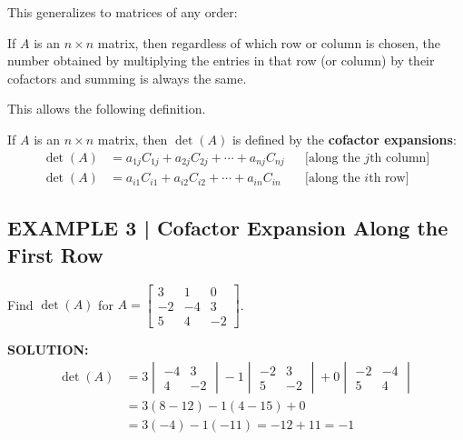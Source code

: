 \documentclass{article}
\theoremstyle{mystyle}
\begin{document}
\vspace{2mm}

This generalizes to matrices of any order:

\begin{tcolorbox}[colback=red!4, colframe=red!60!black,
  title={\textbf{Theorem 2.1.1}}, boxrule=0.5mm, arc=3mm]
If $A$ is an $n\times n$ matrix, then regardless of which row or column is chosen, the number obtained by multiplying the entries in that row (or column) by their cofactors and summing is always the same.
\end{tcolorbox}

This allows the following definition.

\begin{tcolorbox}[colback=teal!4, colframe=teal!65!black,
  title={\textbf{Definition 2}}, boxrule=0.5mm, arc=3mm]
If $A$ is an $n\times n$ matrix, then $\det(A)$ is defined by the \textbf{cofactor expansions}:
\begin{align*}
\det(A)&=a_{1j}C_{1j}+a_{2j}C_{2j}+\cdots+a_{nj}C_{nj} &&\text{[along the }j\text{th column]} \tag{7}\\
\det(A)&=a_{i1}C_{i1}+a_{i2}C_{i2}+\cdots+a_{in}C_{in} &&\text{[along the }i\text{th row]} \tag{8}
\end{align*}
\end{tcolorbox}

\subsection*{EXAMPLE 3 | Cofactor Expansion Along the First Row}
Find $\det(A)$ for $A=\begin{bmatrix}3&1&0\\-2&-4&3\\5&4&-2\end{bmatrix}$.

\textbf{SOLUTION:}
\begin{align*}
\det(A)&=3\begin{vmatrix}-4&3\\4&-2\end{vmatrix}-1\begin{vmatrix}-2&3\\5&-2\end{vmatrix}+0\begin{vmatrix}-2&-4\\5&4\end{vmatrix}\\
&=3(8-12)-1(4-15)+0\\
&=3(-4)-1(-11)=-12+11=\boxed{-1}
\end{align*}
\end{document}

